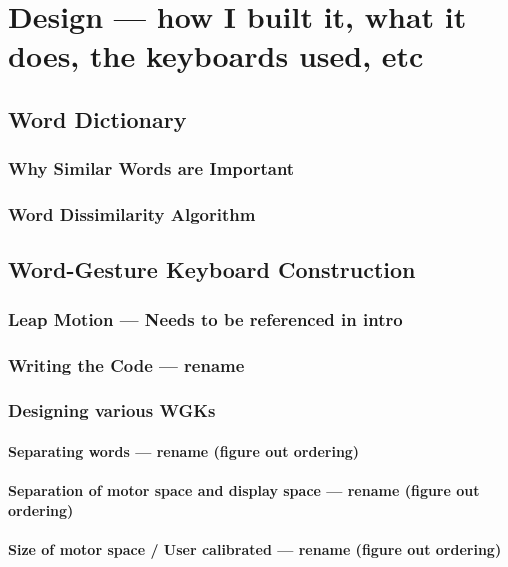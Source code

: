 \chapter{Design --- how I built it, what it does, the keyboards used, etc}

\section{Word Dictionary}

\subsection{Why Similar Words are Important}

\subsection {Word Dissimilarity Algorithm}

\section{Word-Gesture Keyboard Construction}

\subsection{Leap Motion --- Needs to be referenced in intro}

\subsection{Writing the Code --- rename}

\subsection{Designing various WGKs}

\subsubsection{Separating words --- rename (figure out ordering)}

\subsubsection{Separation of motor space and display space --- rename (figure out ordering)}

\subsubsection{Size of motor space / User calibrated --- rename (figure out ordering)}

